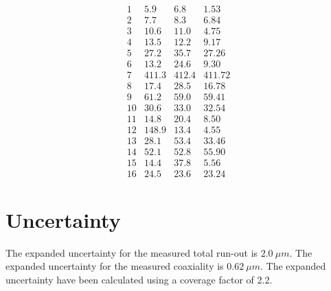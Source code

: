 \documentclass[CIPM]{MSLCalCert}
\begin{document}
\begin{center}
\begin{singlespace}
\[\begin{array}{SSSS}
			1         & 5.9             & 6.8            & 1.53       \\
			2         & 7.7             & 8.3            & 6.84       \\
			3         & 10.6            & 11.0           & 4.75       \\
			4         & 13.5            & 12.2           & 9.17       \\
			5         & 27.2            & 35.7           & 27.26      \\
			6         & 13.2            & 24.6           & 9.30       \\
			7         & 411.3           & 412.4          & 411.72     \\
			8         & 17.4            & 28.5           & 16.78      \\
			9         & 61.2            & 59.0           & 59.41      \\
			10        & 30.6            & 33.0           & 32.54      \\
			11        & 14.8            & 20.4           & 8.50       \\
			12        & 148.9           & 13.4           & 4.55       \\
			13        & 28.1            & 53.4           & 33.46      \\
			14        & 52.1            & 52.8           & 55.90      \\
			15        & 14.4            & 37.8           & 5.56       \\
			16        & 24.5            & 23.6           & 23.24     
		
		\end{array}
	\]
	
\end{singlespace}
\end{center}


\section{Uncertainty}
The expanded uncertainty for the measured total run-out is $\SI{2.0}{\mu m}$. The expanded uncertainty for the measured coaxiality is $\SI{0.62}{\mu m}$. The expanded uncertainty have been calculated using a coverage factor of 2.2.

\end{document}
